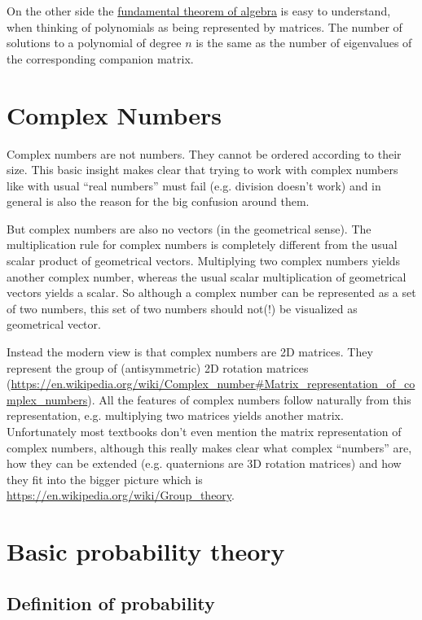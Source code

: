 On the other side the
\href{https://en.wikipedia.org/wiki/Fundamental_theorem_of_algebra}{fundamental
theorem of algebra} is easy to understand, when thinking of polynomials
as being represented by matrices. The number of solutions to a
polynomial of degree $n$ is the same as the number of eigenvalues of
the corresponding companion matrix.

\section{Complex Numbers}
Complex numbers are not numbers. They cannot be ordered according to their size. This basic insight makes clear that trying to work with complex numbers like with usual “real numbers” must fail (e.g. division doesn’t work) and in general is also the reason for the big confusion around them.

But complex numbers are also no vectors (in the geometrical sense). The multiplication rule for complex numbers is completely different from the usual scalar product of geometrical vectors. Multiplying two complex numbers yields another complex number, whereas the usual scalar multiplication of geometrical vectors yields a scalar. So although a complex number can be represented as a set of two numbers, this set of two numbers should not(!) be visualized as geometrical vector.

Instead the modern view is that complex numbers are 2D matrices. They represent the group of (antisymmetric) 2D rotation matrices (\url{https://en.wikipedia.org/wiki/Complex_number#Matrix_representation_of_complex_numbers}). All the features of complex numbers follow naturally from this representation, e.g. multiplying two matrices yields another matrix. Unfortunately most textbooks don’t even mention the matrix representation of complex numbers, although this really makes clear what complex “numbers” are, how they can be extended (e.g. quaternions are 3D rotation matrices) and how they fit into the bigger picture which is \url{https://en.wikipedia.org/wiki/Group_theory}.


\section{Basic probability theory}


\subsection{Definition of probability}

